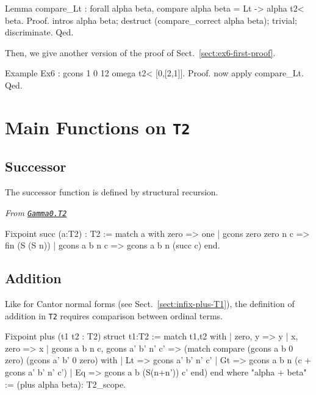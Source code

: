 {\begin{remark}
\begin{Coqsrc}
Lemma compare_Lt : forall alpha beta, compare alpha beta = Lt -> 
                                         alpha t2< beta.
Proof.
  intros alpha beta; destruct (compare_correct alpha beta);
    trivial; discriminate. 
Qed.
\end{Coqsrc}

Then, we give another version of the proof of Sect.~\vref{sect:ex6-first-proof}.

\begin{Coqsrc}
Example Ex6 : gcons 1 0 12 omega t2< [0,[2,1]].
Proof. now apply compare_Lt. Qed.
\end{Coqsrc}

\end{remark}


\section{Main Functions on \texttt{T2}}

\subsection{Successor}
The successor function is defined by structural recursion.

\noindent\emph{From \href{../theories/html/hydras.Gamma0.T2.html\#succ}%
{\texttt{Gamma0.T2}}}
\begin{Coqsrc}
Fixpoint succ (a:T2) : T2 :=
 match a with zero => one
             | gcons zero zero n c => fin (S (S n))
             | gcons a b n c => gcons a b n (succ c)
 end.
\end{Coqsrc}

\subsection{Addition}

Like for Cantor normal forms (see Sect.~\ref{sect:infix-plus-T1}),  the definition of addition in \texttt{T2}  requires comparison between ordinal terms.


\begin{Coqsrc}
Fixpoint plus (t1 t2 : T2) {struct t1}:T2 :=
  match t1,t2 with
  |  zero, y  => y
  |  x, zero => x
  |  gcons a b n c, gcons a' b' n' c' =>
     (match compare (gcons a b 0 zero)
                    (gcons a' b' 0 zero) with
      | Lt => gcons a' b' n' c'
      | Gt => gcons a b n (c + gcons a' b' n' c')
      | Eq => gcons a b (S(n+n')) c'
      end)
  end
where "alpha + beta" := (plus alpha beta): T2_scope.
\end{Coqsrc}

}
